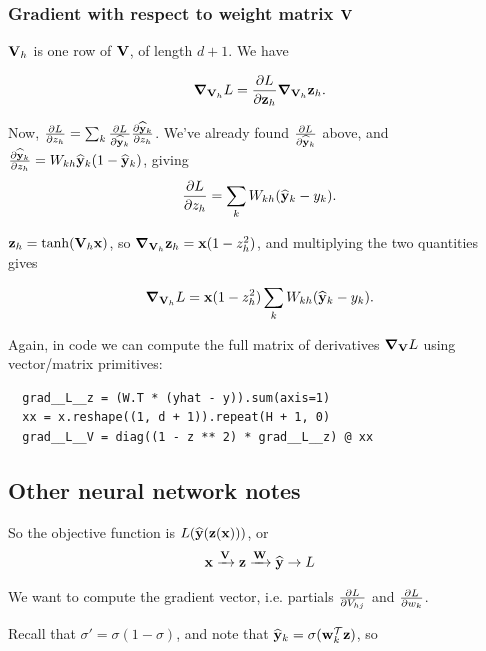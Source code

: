 \subsubsection{Gradient with respect to weight matrix $\mathbf V$}

$\mathbf V_h$ is one row of $\mathbf V$, of length $d + 1$. We have

\begin{align*}
  \grad_{\mathbf V_h} L = \frac{\partial L}{\partial \mathbf z_h}\grad_{\mathbf V_h} \mathbf z_h.
\end{align*}

Now,
$\frac{\partial L}{\partial z_h} = \sum_k \frac{\partial L}{\partial \mathbf{\widehat{y}}_k} \frac{\partial \mathbf{\widehat{y}}_k}{\partial z_h}$.
We've already found $\frac{\partial L}{\partial \mathbf{\widehat{y}}_k}$ above, and
$\frac{\partial \mathbf{\widehat{y}}_k}{\partial z_h} = W_{kh}\mathbf{\widehat{y}}_k(1 - \mathbf{\widehat{y}}_k)$, giving
\begin{align*}
  \frac{\partial L}{\partial z_h} = \sum_k W_{kh} (\mathbf{\widehat{y}}_k - y_k).
\end{align*}

$\mathbf z_h = \tanh(\mathbf V_h \mathbf x)$, so $\grad_{\mathbf V_h} \mathbf z_h = \mathbf x(1 - z_h^2)$, and
multiplying the two quantities gives

\begin{align*}
  \grad_{\mathbf V_h} L =  \mathbf x(1 - z_h^2) \sum_k W_{kh} (\mathbf{\widehat{y}}_k - y_k).
\end{align*}


Again, in code we can compute the full matrix of derivatives $\grad_{\mathbf V} L$
using vector/matrix primitives:

\begin{verbatim}
  grad__L__z = (W.T * (yhat - y)).sum(axis=1)
  xx = x.reshape((1, d + 1)).repeat(H + 1, 0)
  grad__L__V = diag((1 - z ** 2) * grad__L__z) @ xx
\end{verbatim}

\newpage

\subsection{Other neural network notes}

So the objective function is $L({\widehat {\mathbf y}}(\mathbf z(\mathbf x)))$, or
\begin{align*}
  \mathbf x \xrightarrow{\mathbf V} \mathbf z \xrightarrow{\mathbf W} \widehat {\mathbf y} \rightarrow L
\end{align*}

We want to compute the gradient vector, i.e. partials $\frac{\partial L}{\partial V_{hj}}$
and $\frac{\partial L}{\partial w_k}$.

Recall that $\sigma' = \sigma (1 - \sigma)$, and note that
$\mathbf{\widehat{y}}_k = \sigma(\mathbf w_k^\mathcal T \mathbf z)$, so

